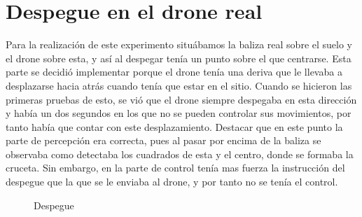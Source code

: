 \section{Despegue en el drone real}
\hspace{1cm} Para la realizaci\'on de este experimento situ\'abamos la baliza real sobre el suelo y el drone sobre esta, y as\'i al despegar ten\'ia un punto sobre el que centrarse. Esta parte se decidi\'o implementar porque el drone ten\'ia una deriva que le llevaba a desplazarse hacia atr\'as cuando ten\'ia que estar en el sitio. Cuando se hicieron las primeras pruebas de esto, se vi\'o que el drone siempre despegaba en esta direcci\'on y hab\'ia un dos segundos en los que no se pueden controlar sus movimientos, por tanto hab\'ia que contar con este desplazamiento. Destacar que en este punto la parte de percepci\'on era correcta, pues al pasar por encima de la baliza se observaba como detectaba los cuadrados de esta y el centro, donde se formaba la cruceta. Sin embargo, en la parte de control ten\'ia mas fuerza la instrucci\'on del despegue que la que se le enviaba al drone, y por tanto no se ten\'ia el control. 

\begin{figure}[H]
 \centering
 \caption{Despegue}
 \label{f:Test Despegue}
\end{figure}


